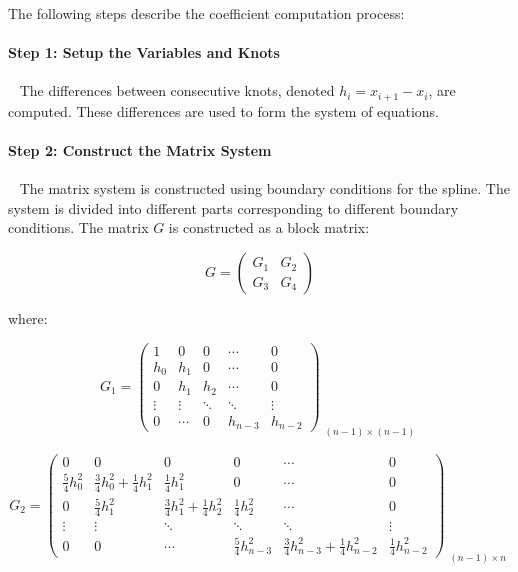 \documentclass{article}
\begin{document}
The following steps describe the coefficient computation process:

\paragraph{Step 1: Setup the Variables and Knots}~{}\newline 
The differences between consecutive knots, denoted \( h_i = x_{i+1} - x_i \), are computed. These differences are used to form the system of equations.

\paragraph{Step 2: Construct the Matrix System}~{}\newline
The matrix system is constructed using boundary conditions for the spline. The system is divided into different parts corresponding to different boundary conditions. The matrix \( G \) is constructed as a block matrix:

\[
G =
\begin{pmatrix}
G_1 & G_2 \\
G_3 & G_4
\end{pmatrix}
\]

where:

\[
G_1 =
\begin{pmatrix}
1 & 0 & 0 & \cdots & 0 \\
h_0 & h_1 & 0 & \cdots & 0 \\
0 & h_1 & h_2 & \cdots & 0 \\
\vdots & \vdots & \ddots & \ddots & \vdots \\
0 & \cdots & 0 & h_{n-3} & h_{n-2}
\end{pmatrix}_{\substack{\text{\((n-1)\times(n-1)\)}}}
\]

\[
G_2 =
\begin{pmatrix}
0 & 0 & 0 & 0 & \cdots & 0 \\
\frac{5}{4}h_0^2 & \frac{3}{4}h_0^2+\frac{1}{4}h_1^2 & \frac{1}{4}h_1^2 & 0 & \cdots & 0 \\
0 & \frac{5}{4}h_1^2 & \frac{3}{4}h_1^2+\frac{1}{4}h_2^2 & \frac{1}{4}h_2^2 & \cdots & 0 \\
\vdots & \vdots & \ddots & \ddots & \ddots & \vdots\\
0 & 0 & \cdots & \frac{5}{4}h_{n-3}^2 & \frac{3}{4}h_{n-3}^2+\frac{1}{4}h_{n-2}^2 & \frac{1}{4}h_{n-2}^2
\end{pmatrix}_{\substack{\text{\((n-1)\times n\)}}}
\]
\end{document}
